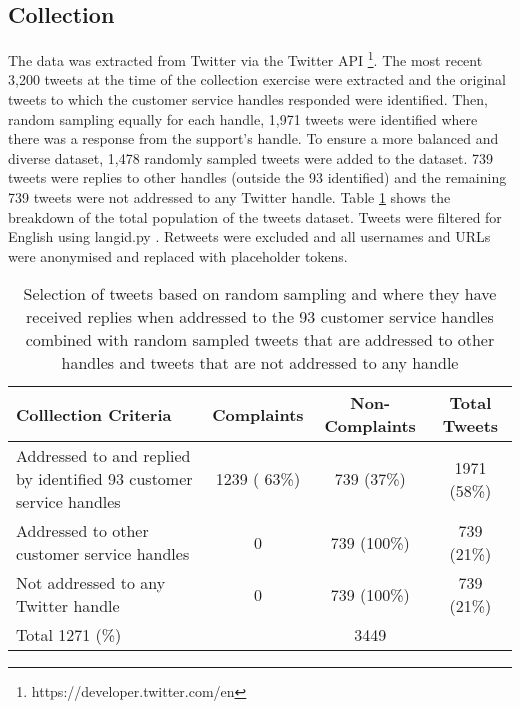 \subsection{Collection}
The data was extracted from Twitter via the Twitter API \footnote{https://developer.twitter.com/en}. The most recent 3,200 tweets at the time of the collection exercise were extracted and the original tweets to which the customer service handles responded were identified. Then, random sampling equally for each handle, 1,971 tweets were identified where there was a response from the support's handle. To ensure a more balanced and diverse dataset, 1,478 randomly sampled tweets were added to the dataset. 739 tweets were replies to other handles (outside the 93 identified) and the remaining 739 tweets were not addressed to any Twitter handle. Table \ref{tab: tweet_counts} shows the breakdown of the total population of the tweets dataset. Tweets were filtered for English using langid.py \cite{luiLangidPyOfftheshelf2012}. Retweets were excluded and all usernames and URLs were anonymised and replaced with placeholder tokens.
\begin{table}[ht]
    \centering
    \begin{tabular}{|l|c|c|c|}
    \hline
    \rowcolor[gray]{0.7}
    \textbf{Colllection Criteria} & \textbf{Complaints} & \textbf{Non-Complaints} & \textbf{Total Tweets} \\
    \hline
    Addressed to and replied by identified 93 customer service handles & 1239 ( 63\%) & 739 (37\%) & 1971 (58\%) \\
    \hline
    Addressed to other customer service handles & 0 & 739 (100\%)& 739 (21\%) \\
    \hline
    Not addressed to any Twitter handle & 0 & 739 (100\%)& 739 (21\%) \\
    \hline    
    \rowcolor[gray]{0.9}
    Total 1271 (\%) & & 3449 \\
    \hline
    \end{tabular}
    \caption{Selection of tweets based on random sampling and where they have received replies when addressed to the 93 customer service handles combined with random sampled tweets that are addressed to other handles and tweets that are not addressed to any handle}    
    \label{tab: tweet_counts}
\end{table}  

